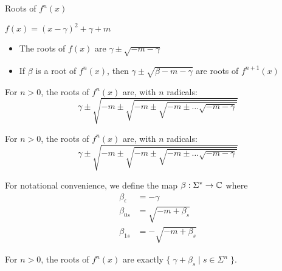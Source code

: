 \begin{frame}[allowframebreaks]{Roots of $f^n(x)$}


  $f(x) = (x-\gamma)^2+\gamma+m$

  \begin{itemize}
    \item The roots of $f(x)$ are $\gamma\pm\sqrt{-m-\gamma}$
    \item If $\beta$ is a root of $f^n(x)$, then $\gamma\pm\sqrt{\beta-m-\gamma}$ are roots of $f^{n+1}(x)$
  \end{itemize}

  \begin{obs}
    For $n>0$, the roots of $f^n(x)$ are, with $n$ radicals:
    $$\gamma\pm\sqrt{-m\pm\sqrt{-m\pm\sqrt{-m\pm\ldots\sqrt{-m-\gamma}}}}$$
  \end{obs}

  \framebreak

  \begin{obs}
    For $n>0$, the roots of $f^n(x)$ are, with $n$ radicals:
    $$\gamma\pm\sqrt{-m\pm\sqrt{-m\pm\sqrt{-m\pm\ldots\sqrt{-m-\gamma}}}}$$
  \end{obs}

  For notational convenience, we define the map $\beta : \Sigma^* \rightarrow \mathbb{C}$ where
  \begin{align*}
    \beta_{\epsilon} &= -\gamma \\
    \beta_{0s} &= \sqrt{-m+\beta_s} \\ 
    \beta_{1s} &= -\sqrt{-m+\beta_s}
  \end{align*}

  For $n>0$, the roots of $f^n(x)$ are exactly $\{\;\gamma+\beta_s\mid s\in\Sigma^n\;\}$.

\end{frame}
